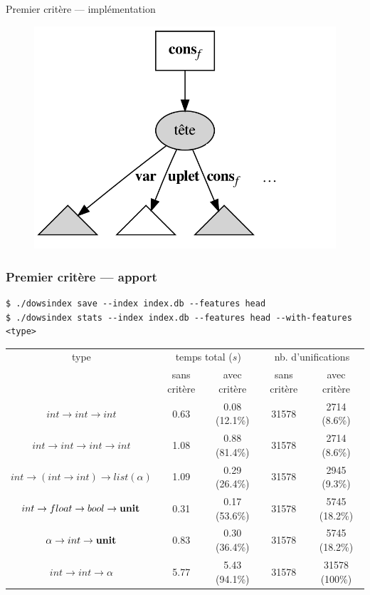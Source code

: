 \documentclass[serif]{beamer}
\begin{document}
\begin{frame}{Premier critère — implémentation}
\begin{figure}[h]
	\includegraphics[scale=0.12]{graphs/crit1_3}
\end{figure}
\end{frame}


\begin{frame}[fragile=singleslide]\frametitle{Premier critère — apport}
\scriptsize
\begin{verbatim}
$ ./dowsindex save --index index.db --features head
$ ./dowsindex stats --index index.db --features head --with-features <type>
\end{verbatim}
\tiny
\begin{table}[h]
	\centering
	\begin{tabular}{|*{5}{c|}}
		\hline
			type &
			\multicolumn{2}{c|}{temps total ($s$)} &
			\multicolumn{2}{c|}{nb. d'unifications}
		\\
		\cline{2-5}
      		&
			sans critère & avec critère &
			sans critère & avec critère
		\\
		\hline
			$int \rightarrow int \rightarrow int$ &
			0.63 & 0.08 (12.1\%) &
			31578 & 2714 (8.6\%)
		\\
			$int \rightarrow int \rightarrow int \rightarrow int$ &
			1.08 & 0.88 (81.4\%) &
			31578 & 2714 (8.6\%)
		\\
			$int \rightarrow (int \rightarrow int) \rightarrow list (\alpha)$ &
			1.09 & 0.29 (26.4\%) &
			31578 & 2945 (9.3\%)
		\\
			$int \rightarrow float \rightarrow bool \rightarrow \bold{unit}$ &
			0.31 & 0.17 (53.6\%) &
			31578 & 5745 (18.2\%)
		\\
			$\alpha \rightarrow int \rightarrow \bold{unit}$ &
			0.83 & 0.30 (36.4\%) &
			31578 & 5745 (18.2\%)
		\\
			$int \rightarrow int \rightarrow \alpha$ &
			5.77 & 5.43 (94.1\%) &
			31578 & 31578 (100\%)
		\\
		\hline
	\end{tabular}
\end{table}
\end{frame}
\end{document}
